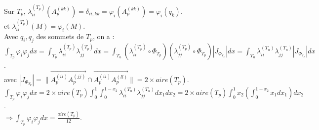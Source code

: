 \documentclass[12pt,a4paper]{article}
\begin{document}
Sur $T_p$, $\lambda_{ii}^{(T_p)}(A_p^{(kk)}) = \delta_{ii, kk} = \varphi_i(A_p^{(kk)}) = \varphi_i(q_k)$. \\
et $\lambda_{ii}^{(T_p)}(M) = \varphi_i(M)$. \\

Avec $q_i, q_j$ des sommets de $T_p$, on a : \\
$\int_{T_p} \varphi_i \varphi_j dx = \int_{T_p} \lambda_{ii}^{(T_p)} \lambda_{jj}^{(T_p)} dx = \int_{T_u} (\lambda_{ii}^{(T_p)} \circ \Phi_{T_p})(\lambda_{jj}^{(T_p)} \circ \Phi_{T_p}) |J_{\Phi_{T_p}}| dx = \int_{T_u} \lambda_{ii}^{(T_u)} \lambda_{jj}^{(T_u)} |J_{\Phi_{T_p}}| dx$. \\
avec $|J_{\Phi_{T_p}}| = \| \overrightarrow{A_p^{(ii)} A_p^{(jj)}} \cap \overrightarrow{A_p^{(ii)} A_p^{(ll)}} \| = 2 \times aire(T_p)$. \\

$\int_{T_p} \varphi_i \varphi_j dx = 2 \times aire(T_p) \int_{0}^{1} \int_{0}^{1 - x_2} \lambda_{ii}^{(T_u)} \lambda_{jj}^{(T_u)} dx_1 dx_2 = 2 \times aire(T_p) \int_{0}^{1} x_2 \left( \int_{0}^{1 - x_2} x_1 dx_1 \right) dx_2$. \\
$\Rightarrow \int_{T_p} \varphi_i \varphi_j dx = \frac{aire(T_p)}{12}$. \\
\end{document}
